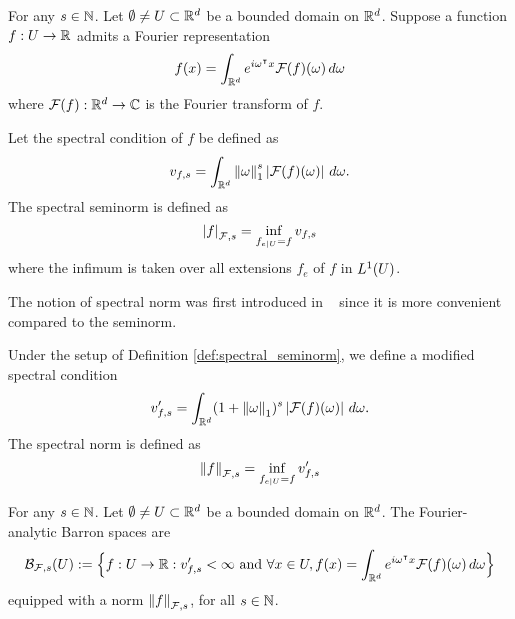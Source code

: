 
\begin{definition}
    \label{def:spectral_seminorm}
    For any $s \in \mathbb{N}$. Let $\emptyset \not= U \subset \mathbb{R}^d$ be a bounded
    domain on $\mathbb{R}^d$. Suppose a function $f: U \to \mathbb{R}$ admits a Fourier
    representation
    \begin{equation}
        f(x) = \int_{\mathbb{R}^d} e^{i\omega{}^{\intercal} x} \mathcal{F}(f)(\omega) \,d\omega
    \end{equation}
    where $\mathcal{F}(f): \mathbb{R}^d \to \mathbb{C}$ is the Fourier transform of $f$.

    Let the spectral condition of $f$ be defined as
    \begin{equation}
        \label{eq:spectral_condition}
        v_{f,s} 
            = \int_{\mathbb{R}^d} \left\| \omega \right\|_1^s \left| \mathcal{F}(f)(\omega) \right|\,d\omega.
    \end{equation}
    The spectral seminorm is defined as
    \begin{equation}
        \left| f \right|_{\mathcal{F}, {s}} = \inf_{f_{e\mid U} = f} v_{f,s}
    \end{equation}
    where the infimum is taken over all extensions $f_e$ of $f$ in $L^{1}(U)$.
\end{definition}

The notion of spectral norm was first introduced in
~\cite{siegelApproximationRatesNeural2021} since it is more convenient compared
to the seminorm.

\begin{definition}
    \label{def:spectral_norm}
    Under the setup of Definition \ref{def:spectral_seminorm}, we define a
    modified spectral condition
    \begin{equation}
        \label{eq:spectral_condition_mod}
        v'_{f,s} 
            = \int_{\mathbb{R}^d} (1 + \left\| \omega \right\|_1)^s \left| \mathcal{F}(f)(\omega) \right|
            \,d\omega.
    \end{equation}
    The spectral norm is defined as
    \begin{equation}
        \left\| f \right\|_{\mathcal{F}, {s}} = \inf_{f_{e\mid U} = f} v'_{f,s}
    \end{equation}
\end{definition}

\begin{definition}
    \label{def:fourier_space}
    For any $s \in \mathbb{N}$. Let $\emptyset \not= U \subset \mathbb{R}^d$ be a bounded
    domain on $\mathbb{R}^d$. The Fourier-analytic Barron spaces are
    \begin{equation}
        \mathcal{B}_{\mathcal{F},s}(U) := \Big\{
            f: U \to \mathbb{R}: v'_{f,s} < \infty  \textnormal{ and }
            \forall x\in U, 
                f(x) = \int_{\mathbb{R}^d} e^{i\omega{}^{\intercal} x} \mathcal{F}(f)(\omega)\,d\omega
        \Big\}
    \end{equation}
    equipped with a norm $\left\| f \right\|_{\mathcal{F}, {s}}$, for all $s \in \mathbb{N}$.
\end{definition}

